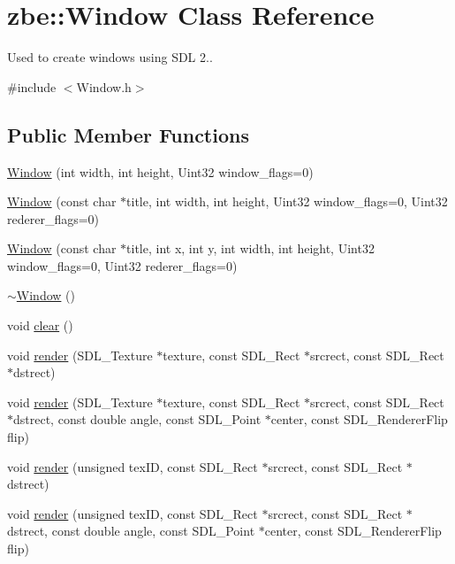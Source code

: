 \hypertarget{classzbe_1_1_window}{}\section{zbe\+:\+:Window Class Reference}
\label{classzbe_1_1_window}


Used to create windows using S\+D\+L 2..  




{\ttfamily \#include $<$Window.\+h$>$}

\subsection*{Public Member Functions}
\begin{DoxyCompactItemize}
\item 
\hyperlink{classzbe_1_1_window_ae87c358f8fb31ce7f22475a881dc6530}{Window} (int width, int height, Uint32 window\+\_\+flags=0)
\item 
\hyperlink{classzbe_1_1_window_a27728e4d41f05485e0675b33d8f20200}{Window} (const char $\ast$title, int width, int height, Uint32 window\+\_\+flags=0, Uint32 rederer\+\_\+flags=0)
\item 
\hyperlink{classzbe_1_1_window_ace3681780598adf45a6eb23986d7ca28}{Window} (const char $\ast$title, int x, int y, int width, int height, Uint32 window\+\_\+flags=0, Uint32 rederer\+\_\+flags=0)
\item 
\hyperlink{classzbe_1_1_window_a5d4159697767615290b573a736289717}{$\sim$\+Window} ()
\item 
void \hyperlink{classzbe_1_1_window_acce2f3781015f07f4bceaedfdc532ef0}{clear} ()
\item 
void \hyperlink{classzbe_1_1_window_ab7a17f206733069edf81077158f8e716}{render} (S\+D\+L\+\_\+\+Texture $\ast$texture, const S\+D\+L\+\_\+\+Rect $\ast$srcrect, const S\+D\+L\+\_\+\+Rect $\ast$dstrect)
\item 
void \hyperlink{classzbe_1_1_window_a4279ab8613bdc10773eec0043b545259}{render} (S\+D\+L\+\_\+\+Texture $\ast$texture, const S\+D\+L\+\_\+\+Rect $\ast$srcrect, const S\+D\+L\+\_\+\+Rect $\ast$dstrect, const double angle, const S\+D\+L\+\_\+\+Point $\ast$center, const S\+D\+L\+\_\+\+Renderer\+Flip flip)
\item 
void \hyperlink{classzbe_1_1_window_a049d52d9e819193c17fe1f976d3f0c8c}{render} (unsigned tex\+I\+D, const S\+D\+L\+\_\+\+Rect $\ast$srcrect, const S\+D\+L\+\_\+\+Rect $\ast$dstrect)
\item 
void \hyperlink{classzbe_1_1_window_a522deb589562f9097d7b9be4cc2b0f5b}{render} (unsigned tex\+I\+D, const S\+D\+L\+\_\+\+Rect $\ast$srcrect, const S\+D\+L\+\_\+\+Rect $\ast$dstrect, const double angle, const S\+D\+L\+\_\+\+Point $\ast$center, const S\+D\+L\+\_\+\+Renderer\+Flip flip)

\end{DoxyCompactItemize}
